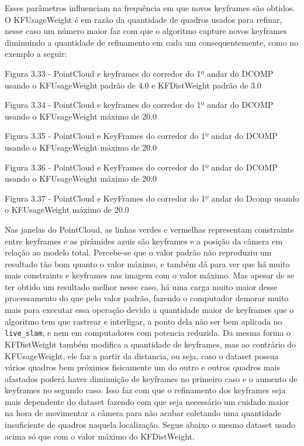 

Esses parâmetros influenciam na frequência em que novos keyframes são obtidos. O KFUsageWeight é em razão da quantidade de quadros usados para refinar, nesse caso um número maior faz com que o algoritmo capture novos keyframes diminuindo a quantidade de refinamento em cada um consequentemente, como no exemplo a seguir:


Figura 3.33 - PointCloud e keyframes do corredor do 1º andar do DCOMP usando o KFUsageWeight padrão de 4.0 e KFDistWeight padrão de 3.0

Figura 3.34 - PointCloud e keyframes do corredor do 1º andar do DCOMP usando o KFUsageWeight máximo de 20.0

Figura 3.35 - PointCloud e KeyFrames do corredor do 1º andar do DCOMP usando o KFUsageWeight máximo de 20.0

Figura 3.36 - PointCloud e KeyFrames do corredor do 1º andar do DCOMP usando o KFUsageWeight máximo de 20.0

Figura 3.37 - PointCloud e KeyFrames do corredor do 1º andar do Dcomp usando o KFUsageWeight máximo de 20.0

Nas janelas do PointCloud, as linhas verdes e vermelhas representam constraints entre keyframes e as pirâmides azuis são keyframes e a posição da câmera em relação ao modelo total. Percebe-se que o valor padrão não reproduziu um resultado tão bom quanto o valor máximo, e também dá para ver que há muito mais constraints e keyframes nas imagem com o valor máximo. Mas apesar de se ter obtido um resultado melhor nesse caso, há uma carga muito maior desse processamento do que pelo valor padrão, fazendo o computador demorar muito mais para executar essa operação devido a quantidade maior de keyframes que o algoritmo tem que rastrear e interligar, a ponto dela não ser bem aplicada no \texttt{live\_slam}, e nem em computadores com potencia reduzida. Da mesma forma o KFDistWeight também modifica a quantidade de keyframes, mas ao contrário do KFUsageWeight, ele faz a partir da distancia, ou seja, caso o dataset possua vários quadros bem próximos fisicamente um do outro e outros quadros mais afastados poderá haver diminuição de keyframes no primeiro caso e o aumento de keyframes no segundo caso. Isso faz com que o refinamento dos keyframes seja mais dependente do dataset fazendo com que seja necessário um cuidado maior na hora de movimentar a câmera para não acabar coletando uma quantidade insuficiente de quadros naquela localização. Segue abaixo o mesmo dataset usado acima só que com o valor máximo do KFDistWeight.

